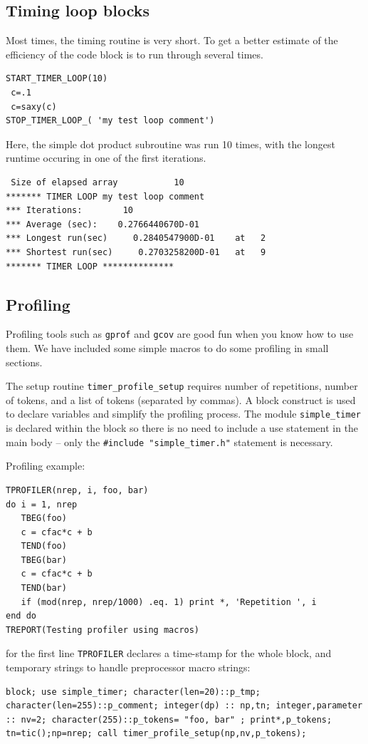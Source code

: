 \documentclass[a4paper,11pt]{article}
\begin{document}
\subsection{Timing loop blocks}
\label{sec:org50e06d0}

Most times, the timing routine is very short. To get a better estimate of
the efficiency of the code block is to run through several times.
 
\begin{lstlisting}
START_TIMER_LOOP(10)
 c=.1
 c=saxy(c)
STOP_TIMER_LOOP_( 'my test loop comment')
\end{lstlisting}

Here, the simple dot product subroutine was run 10 times, with the longest runtime occuring in one of the first iterations.
\begin{lstlisting}
 Size of elapsed array           10
******* TIMER LOOP my test loop comment
*** Iterations:        10
*** Average (sec):    0.2766440670D-01
*** Longest run(sec)     0.2840547900D-01    at   2
*** Shortest run(sec)     0.2703258200D-01   at   9
******* TIMER LOOP **************
\end{lstlisting}

\subsection{Profiling}
\label{sec:orgce5802e}

Profiling tools such as \texttt{gprof} and \texttt{gcov} are good fun when you know how
to use them. We have included some simple macros to do some profiling in
small sections.  

The setup routine \texttt{timer\_profile\_setup} requires number of repetitions,
number of tokens, and a list of tokens (separated by commas). A block
construct is used to declare variables and simplify the profiling
process. The module \texttt{simple\_timer} is declared within the block so there
is no need to include a use statement in the main body -- only 
the \texttt{\#include "simple\_timer.h"} statement is necessary.

Profiling example: 
\begin{lstlisting}
TPROFILER(nrep, i, foo, bar)
do i = 1, nrep
   TBEG(foo)
   c = cfac*c + b
   TEND(foo)
   TBEG(bar)
   c = cfac*c + b
   TEND(bar)
   if (mod(nrep, nrep/1000) .eq. 1) print *, 'Repetition ', i
end do
TREPORT(Testing profiler using macros)
\end{lstlisting}

for the first line \texttt{TPROFILER} declares a time-stamp
for the whole block, and temporary strings to handle preprocessor macro strings:
\begin{lstlisting}
block; use simple_timer; character(len=20)::p_tmp; character(len=255)::p_comment; integer(dp) :: np,tn; integer,parameter :: nv=2; character(255)::p_tokens= "foo, bar" ; print*,p_tokens; tn=tic();np=nrep; call timer_profile_setup(np,nv,p_tokens);
\end{lstlisting}
\end{document}
